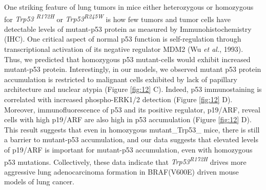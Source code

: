 One striking feature of lung tumors in mice either heterozygous or homozygous for \emph{Trp53 \textsuperscript{R172H}} or \emph{Trp53\textsuperscript{R245W}} is how few tumors and tumor cells have detectable levels of mutant-p53 protein as measured by Immunohistochemistry (IHC). One critical aspect of normal p53 function is self-regulation through transcriptional activation of its negative regulator MDM2 (Wu \emph{et al.}, 1993). Thus, we predicted that homozygous p53 mutant-cells would exhibit increased mutant-p53 protein. Interestingly, in our models, we observed mutant p53 protein accumulation is restricted to malignant cells exhibited by lack of papillary architecture and nuclear atypia (Figure \ref{fig:12} C). Indeed, p53 immunostaining is correlated with increased phospho-ERK1/2 detection (Figure \ref{fig:12} D). Moreover, immunofluorescence of p53 and its positive regulator, p19/ARF, reveal cells with high p19/ARF are also high in p53 accumulation (Figure \ref{fig:12} D). This result suggests that even in homozygous mutant\_Trp53\_ mice, there is still a barrier to mutant-p53 accumulation, and our data suggests that elevated levels of p19/ARF is important for mutant-p53 accumulation, even with homozygous p53 mutations. Collectively, these data indicate that \emph{Trp53\textsuperscript{R172H}} drives more aggressive lung adenocarcinoma formation in BRAF(V600E) driven mouse models of lung cancer.

